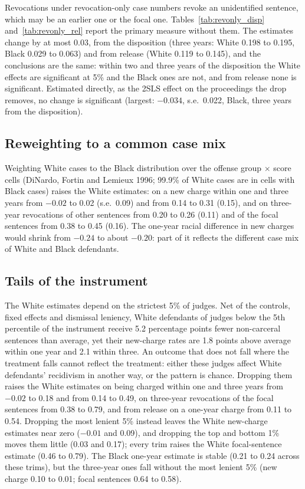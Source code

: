 \documentclass[11pt]{article}
\begin{document}
Revocations under revocation-only case numbers revoke an unidentified sentence, which may be an earlier one or the focal one. Tables~\ref{tab:revonly_disp} and~\ref{tab:revonly_rel} report the primary measure without them. The estimates change by at most 0.03, from the disposition (three years: White 0.198 to 0.195, Black 0.029 to 0.063) and from release (White 0.119 to 0.145), and the conclusions are the same: within two and three years of the disposition the White effects are significant at 5\% and the Black ones are not, and from release none is significant. Estimated directly, as the 2SLS effect on the proceedings the drop removes, no change is significant (largest: $-0.034$, s.e.\ 0.022, Black, three years from the disposition).

\subsection{Reweighting to a common case mix}\label{sec:reweight}

Weighting White cases to the Black distribution over the offense group $\times$ score cells (DiNardo, Fortin and Lemieux 1996; 99.9\% of White cases are in cells with Black cases) raises the White estimates: on a new charge within one and three years from $-0.02$ to 0.02 (s.e.\ 0.09) and from 0.14 to 0.31 (0.15), and on three-year revocations of other sentences from 0.20 to 0.26 (0.11) and of the focal sentences from 0.38 to 0.45 (0.16). The one-year racial difference in new charges would shrink from $-0.24$ to about $-0.20$: part of it reflects the different case mix of White and Black defendants.

\subsection{Tails of the instrument}\label{sec:tails}

The White estimates depend on the strictest 5\% of judges. Net of the controls, fixed effects and dismissal leniency, White defendants of judges below the 5th percentile of the instrument receive 5.2 percentage points fewer non-carceral sentences than average, yet their new-charge rates are 1.8 points above average within one year and 2.1 within three. An outcome that does not fall where the treatment falls cannot reflect the treatment: either these judges affect White defendants' recidivism in another way, or the pattern is chance. Dropping them raises the White estimates on being charged within one and three years from $-0.02$ to 0.18 and from 0.14 to 0.49, on three-year revocations of the focal sentences from 0.38 to 0.79, and from release on a one-year charge from 0.11 to 0.54. Dropping the most lenient 5\% instead leaves the White new-charge estimates near zero ($-0.01$ and 0.09), and dropping the top and bottom 1\% moves them little (0.03 and 0.17); every trim raises the White focal-sentence estimate (0.46 to 0.79). The Black one-year estimate is stable (0.21 to 0.24 across these trims), but the three-year ones fall without the most lenient 5\% (new charge 0.10 to 0.01; focal sentences 0.64 to 0.58).
\end{document}
